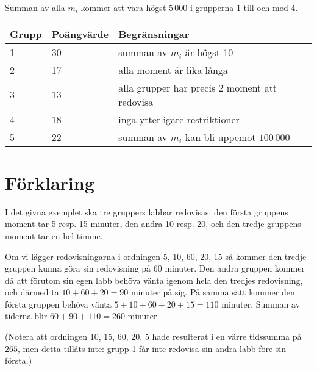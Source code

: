 Summan av alla $m_i$ kommer att vara högst $5\,000$ i grupperna 1 till och med 4.

\begin{tabular}{| l | l | l |}
	\hline
	Grupp & Poängvärde & Begränsningar\\ \hline
  1     & 30         & summan av $m_i$ är högst 10 \\ \hline
  2     & 17         & alla moment är lika långa \\ \hline
  3     & 13         & alla grupper har precis 2 moment att redovisa \\ \hline
  4     & 18         & inga ytterligare restriktioner \\ \hline
  5     & 22         & summan av $m_i$ kan bli uppemot $100\,000$ \\ \hline
\end{tabular}

\section*{Förklaring}
I det givna exemplet ska tre gruppers labbar redovisas: den första gruppens moment tar 5 resp. 15 minuter, den andra 10 resp. 20, och den tredje gruppens moment tar en hel timme.

Om vi lägger redovisningarna i ordningen 5, 10, 60, 20, 15 så kommer den tredje gruppen kunna göra sin redovisning på 60 minuter.
Den andra gruppen kommer då att förutom sin egen labb behöva vänta igenom hela den tredjes redovisning, och därmed ta $10+60+20 = 90$ minuter på sig.
På samma sätt kommer den första gruppen behöva vänta $5+10+60+20+15 = 110$ minuter.
Summan av tiderna blir $60 + 90 + 110 = 260$ minuter.

(Notera att ordningen 10, 15, 60, 20, 5 hade resulterat i en värre tidssumma på $265$, men detta tillåts inte: grupp 1 får inte redovisa sin andra labb före sin första.)
